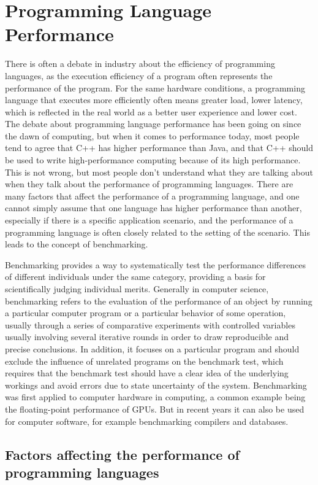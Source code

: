 \section{Programming Language Performance}


There is often a debate in industry about the efficiency of programming languages, as the execution efficiency of a program often represents the performance of the program. For the same hardware conditions, a programming language that executes more efficiently often means greater load, lower latency, which is reflected in the real world as a better user experience and lower cost. The debate about programming language performance has been going on since the dawn of computing, but when it comes to performance today, most people tend to agree that C++ has higher performance than Java, and that C++ should be used to write high-performance computing because of its high performance. This is not wrong, but most people don't understand what they are talking about when they talk about the performance of programming languages. There are many factors that affect the performance of a programming language, and one cannot simply assume that one language has higher performance than another, especially if there is a specific application scenario, and the performance of a programming language is often closely related to the setting of the scenario. This leads to the concept of benchmarking.

Benchmarking provides a way to systematically test the performance differences of different individuals under the same category, providing a basis for scientifically judging individual merits. Generally in computer science, benchmarking refers to the evaluation of the performance of an object by running a particular computer program or a particular behavior of some operation, usually through a series of comparative experiments with controlled variables usually involving several iterative rounds in order to draw reproducible and precise conclusions. In addition, it focuses on a particular program and should exclude the influence of unrelated programs on the benchmark test, which requires that the benchmark test should have a clear idea of the underlying workings and avoid errors due to state uncertainty of the system. Benchmarking was first applied to computer hardware in computing, a common example being the floating-point performance of GPUs. But in recent years it can also be used for computer software, for example benchmarking compilers and databases.

\subsection{Factors affecting the performance of programming languages}

